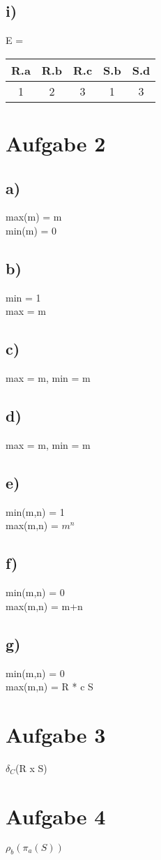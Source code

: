 \documentclass{article}
\begin{document}
	\subsection*{i)}
	E = 
	\begin{tabular}{c|c|c|c|c}
		R.a & R.b & R.c & S.b & S.d \\
		\hline \hline
		1 & 2 & 3 & 1 & 3
	\end{tabular}
	\section*{Aufgabe 2}
	\subsection*{a)}
	max(m) = m \\
	min(m)  = 0
	\subsection*{b)}
	min = 1 \\
	max = m
	\subsection*{c)}
	max = m, min = m
	\subsection*{d)}
	max = m, min = m
	\subsection*{e)}
	min(m,n) = 1 \\
	max(m,n) = $m^{n}$
	\subsection*{f)}
	min(m,n) = 0 \\
	max(m,n) = m+n
	\subsection*{g)}
	min(m,n) = 0 \\
	max(m,n) = R * c S
	\section*{Aufgabe 3}
	$\delta_C$(R x S)
	\section*{Aufgabe 4}
	$\rho_{b}(\pi_{a}(S))$
\end{document}

